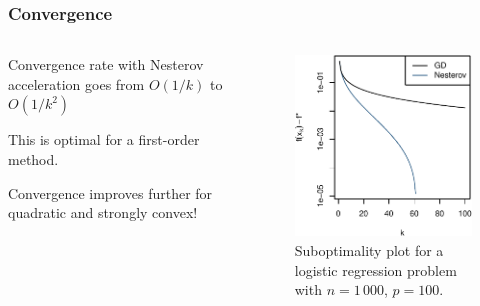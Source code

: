 \documentclass[aspectratio=1610,onlytextwidth]{beamer}
\begin{document}
\begin{frame}[c]
  \frametitle{Convergence}
  \begin{columns}
    \begin{column}{0.45\textwidth}
      Convergence rate with Nesterov acceleration goes from $O(1/k)$ to $O(1/k^2)$

      \medskip\pause

      This is \alert{optimal} for a first-order method.

      \medskip\pause

      Convergence improves further for quadratic and strongly convex!

    \end{column}
    \begin{column}{0.45\textwidth}
      \begin{figure}[htpb]
        \centering
        \includegraphics[]{images/momentum-convergence.pdf}
        \caption{%
          Suboptimality plot for a
          logistic regression problem with $n = 1\,000$, $p = 100$.
        }
      \end{figure}
    \end{column}
  \end{columns}

\end{frame}
\end{document}
